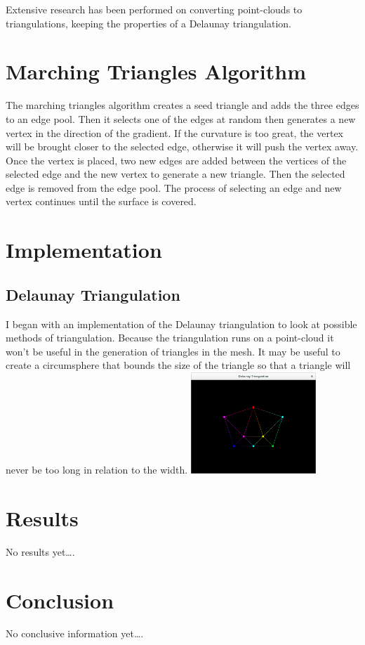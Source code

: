 \documentclass[conference]{acmsiggraph}
\begin{document}
Extensive research has been performed on converting point-clouds to
triangulations, keeping the properties of a Delaunay triangulation.

\section{Marching Triangles Algorithm}
The marching triangles algorithm creates a seed triangle and adds the three
edges to an edge pool. Then it selects one of the edges at random then
generates a new vertex in the direction of the gradient. If the curvature is
too great, the vertex will be brought closer to the selected edge, otherwise it
will push the vertex away. Once the vertex is placed, two new edges are added
between the vertices of the selected edge and the new vertex to generate a new
triangle. Then the selected edge is removed from the edge pool. The process of
selecting an edge and new vertex continues until the surface is covered.

\section {Implementation}

\subsection{Delaunay Triangulation}
I began with an implementation of the Delaunay triangulation to look at
possible methods of triangulation. Because the triangulation runs on a
point-cloud it won't be useful in the generation of triangles in the mesh. It
may be useful to create a circumsphere that bounds the size of the triangle so
that a triangle will never be too long in relation to the width.
\includegraphics[height=1.5in]{images/Triangulated.png}

\section{Results}
No results yet\ldots.


\section{Conclusion}
No conclusive information yet\ldots.



\nocite{*}

\end{document}
